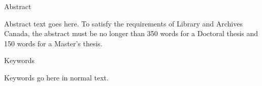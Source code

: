 \begin{center} \titlefont Abstract \end{center}

Abstract text goes here.
To satisfy the requirements of Library and Archives Canada, the abstract must be no longer than 350 words for a Doctoral thesis and 150 words for a Master's thesis.

{\Large Keywords}

Keywords go here in normal text.